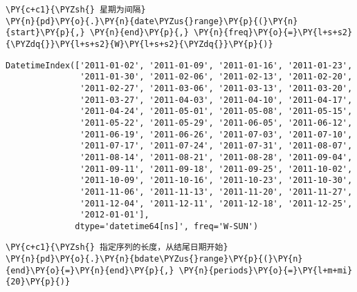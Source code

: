    \begin{tcolorbox}[breakable, size=fbox, boxrule=1pt, pad at break*=1mm,colback=cellbackground, colframe=cellborder]
\begin{Verbatim}[commandchars=\\\{\}]
\PY{c+c1}{\PYZsh{} 星期为间隔}
\PY{n}{pd}\PY{o}{.}\PY{n}{date\PYZus{}range}\PY{p}{(}\PY{n}{start}\PY{p}{,} \PY{n}{end}\PY{p}{,} \PY{n}{freq}\PY{o}{=}\PY{l+s+s2}{\PYZdq{}}\PY{l+s+s2}{W}\PY{l+s+s2}{\PYZdq{}}\PY{p}{)}
\end{Verbatim}
\end{tcolorbox}

            \begin{tcolorbox}[breakable, size=fbox, boxrule=.5pt, pad at break*=1mm, opacityfill=0]
\begin{Verbatim}[commandchars=\\\{\}]
DatetimeIndex(['2011-01-02', '2011-01-09', '2011-01-16', '2011-01-23',
               '2011-01-30', '2011-02-06', '2011-02-13', '2011-02-20',
               '2011-02-27', '2011-03-06', '2011-03-13', '2011-03-20',
               '2011-03-27', '2011-04-03', '2011-04-10', '2011-04-17',
               '2011-04-24', '2011-05-01', '2011-05-08', '2011-05-15',
               '2011-05-22', '2011-05-29', '2011-06-05', '2011-06-12',
               '2011-06-19', '2011-06-26', '2011-07-03', '2011-07-10',
               '2011-07-17', '2011-07-24', '2011-07-31', '2011-08-07',
               '2011-08-14', '2011-08-21', '2011-08-28', '2011-09-04',
               '2011-09-11', '2011-09-18', '2011-09-25', '2011-10-02',
               '2011-10-09', '2011-10-16', '2011-10-23', '2011-10-30',
               '2011-11-06', '2011-11-13', '2011-11-20', '2011-11-27',
               '2011-12-04', '2011-12-11', '2011-12-18', '2011-12-25',
               '2012-01-01'],
              dtype='datetime64[ns]', freq='W-SUN')
\end{Verbatim}
\end{tcolorbox}
        
    \begin{tcolorbox}[breakable, size=fbox, boxrule=1pt, pad at break*=1mm,colback=cellbackground, colframe=cellborder]
\begin{Verbatim}[commandchars=\\\{\}]
\PY{c+c1}{\PYZsh{} 指定序列的长度，从结尾日期开始}
\PY{n}{pd}\PY{o}{.}\PY{n}{bdate\PYZus{}range}\PY{p}{(}\PY{n}{end}\PY{o}{=}\PY{n}{end}\PY{p}{,} \PY{n}{periods}\PY{o}{=}\PY{l+m+mi}{20}\PY{p}{)}
\end{Verbatim}
\end{tcolorbox}

